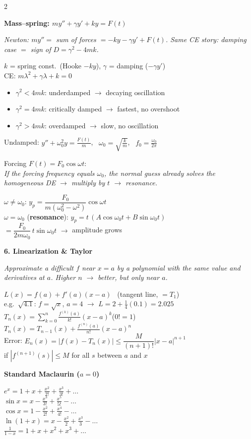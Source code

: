 \documentclass[10pt]{article}
\newcommand{\sect}[2]{%
  \par\vspace{12pt}\noindent                      %
  \colorbox{#1}{\parbox{\dimexpr\columnwidth-2\fboxsep}{\color{white}\bfseries #2}}%
  \par\vspace{4pt}}                               %
\newcommand{\sub}[1]{\par\vspace{7pt}\textbf{#1}\par\vspace{2pt}}  %
\newcommand{\expl}[1]{{\color{gray!80!black}\itshape #1}\par}
\begin{document}
\begin{multicols}{2}
\sub{Mass--spring: $my''+\gamma y'+ky=F(t)$}
\expl{Newton: $my''=$ sum of forces $=-ky-\gamma y'+F(t)$. Same CE story: damping case $=$ sign of $D=\gamma^2-4mk$.}
$k$ = spring const.\ (Hooke $-ky$), $\gamma$ = damping ($-\gamma y'$)\\
CE: $m\lambda^2+\gamma\lambda+k=0$
\begin{itemize}
  \item $\gamma^2<4mk$: underdamped $\rightarrow$ decaying oscillation
  \item $\gamma^2=4mk$: critically damped $\rightarrow$ fastest, no overshoot
  \item $\gamma^2>4mk$: overdamped $\rightarrow$ slow, no oscillation
\end{itemize}
Undamped: $y''+\omega_0^2y=\frac{F(t)}{m}$, \ $\omega_0=\sqrt{\frac km}$, \ $f_0=\frac{\omega_0}{2\pi}$

Forcing $F(t)=F_0\cos\omega t$:\\
\expl{If the forcing frequency equals $\omega_0$, the normal guess already solves the homogeneous DE $\rightarrow$ multiply by $t$ $\rightarrow$ resonance.}
$\omega\neq\omega_0$: $y_p=\dfrac{F_0}{m(\omega_0^2-\omega^2)}\cos\omega t$\\[2pt]
$\omega=\omega_0$ (\textbf{resonance}): $y_p=t\,(A\cos\omega_0t+B\sin\omega_0t)$\\
\hspace*{1.2em}$=\dfrac{F_0}{2m\omega_0}\,t\sin\omega_0t$ $\rightarrow$ amplitude grows

\sect{cTay}{6. Linearization \& Taylor}
\expl{Approximate a difficult $f$ near $x=a$ by a polynomial with the same value and derivatives at $a$. Higher $n$ $\rightarrow$ better, but only near $a$.}
$L(x)=f(a)+f'(a)(x-a)$ \ (tangent line, $=T_1$)\\
e.g.\ $\sqrt{4.1}$: $f=\sqrt x$, $a=4$ $\rightarrow$ $L=2+\frac14(0.1)=2.025$\\
$\displaystyle T_n(x)=\sum_{k=0}^{n}\frac{f^{(k)}(a)}{k!}(x-a)^k$\quad ($0!=1$)\\
$T_n(x)=T_{n-1}(x)+\frac{f^{(n)}(a)}{n!}(x-a)^n$\\
Error: $E_n(x)=|f(x)-T_n(x)|\le\dfrac{M}{(n+1)!}|x-a|^{n+1}$\\
if $|f^{(n+1)}(s)|\le M$ for all $s$ between $a$ and $x$

\sub{Standard Maclaurin ($a=0$)}
$e^x=1+x+\frac{x^2}{2!}+\frac{x^3}{3!}+\dots$\\
$\sin x=x-\frac{x^3}{3!}+\frac{x^5}{5!}-\dots$\\
$\cos x=1-\frac{x^2}{2!}+\frac{x^4}{4!}-\dots$\\
$\ln(1+x)=x-\frac{x^2}{2}+\frac{x^3}{3}-\dots$\\
$\frac{1}{1-x}=1+x+x^2+x^3+\dots$


\end{multicols}
\end{document}
